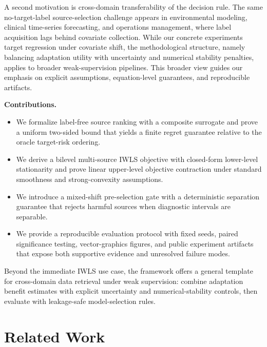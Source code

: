 \documentclass{article} %
\begin{document}
A second motivation is cross-domain transferability of the decision rule. The same no-target-label source-selection challenge appears in environmental modeling, clinical time-series forecasting, and operations management, where label acquisition lags behind covariate collection. While our concrete experiments target regression under covariate shift, the methodological structure, namely balancing adaptation utility with uncertainty and numerical stability penalties, applies to broader weak-supervision pipelines. This broader view guides our emphasis on explicit assumptions, equation-level guarantees, and reproducible artifacts.

\textbf{Contributions.}
\begin{itemize}
\item We formalize label-free source ranking with a composite surrogate and prove a uniform two-sided bound that yields a finite regret guarantee relative to the oracle target-risk ordering.
\item We derive a bilevel multi-source IWLS objective with closed-form lower-level stationarity and prove linear upper-level objective contraction under standard smoothness and strong-convexity assumptions.
\item We introduce a mixed-shift pre-selection gate with a deterministic separation guarantee that rejects harmful sources when diagnostic intervals are separable.
\item We provide a reproducible evaluation protocol with fixed seeds, paired significance testing, vector-graphics figures, and public experiment artifacts that expose both supportive evidence and unresolved failure modes.
\end{itemize}

Beyond the immediate IWLS use case, the framework offers a general template for cross-domain data retrieval under weak supervision: combine adaptation benefit estimates with explicit uncertainty and numerical-stability controls, then evaluate with leakage-safe model-selection rules.

\section{Related Work}
\end{document}
